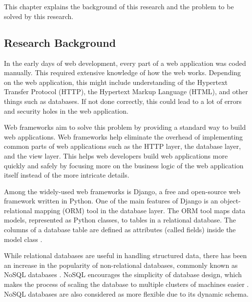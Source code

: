 \chapter{\babSatu}

This chapter explains the background of this research and the problem to be
solved by this research.

\section{Research Background}

In the early days of web development, every part of a web application was coded
manually. This required extensive knowledge of how the web works. Depending on
the web application, this might include understanding of the Hypertext Transfer
Protocol (HTTP), the Hypertext Markup Language (HTML), and other things such as
databases. If not done correctly, this could lead to a lot of errors and
security holes in the web application.

Web frameworks aim to solve this problem by providing a standard way to build
web applications. Web frameworks help eliminate the overhead of implementing
common parts of web applications such as the HTTP layer, the database layer,
and the view layer. This helps web developers build web applications more
quickly and safely by focusing more on the business logic of the web
application itself instead of the more intricate details.

Among the widely-used web frameworks is Django, a free and open-source web
framework written in Python. One of the main features of Django is an
object-relational mapping (ORM) tool in the database layer. The ORM tool maps
data models, represented as Python classes, to tables in a relational database.
The columns of a database table are defined as attributes (called fields)
inside the model class \cite{django}.

While relational databases are useful in handling structured data, there has
been an increase in the popularity of non-relational databases, commonly known
as NoSQL databases \cite{paul_nosql}. NoSQL encourages the simplicity of
database design, which makes the process of scaling the database to multiple
clusters of machines easier \cite{leavitt_nosql}. NoSQL databases are also
considered as more flexible due to its dynamic schema.

